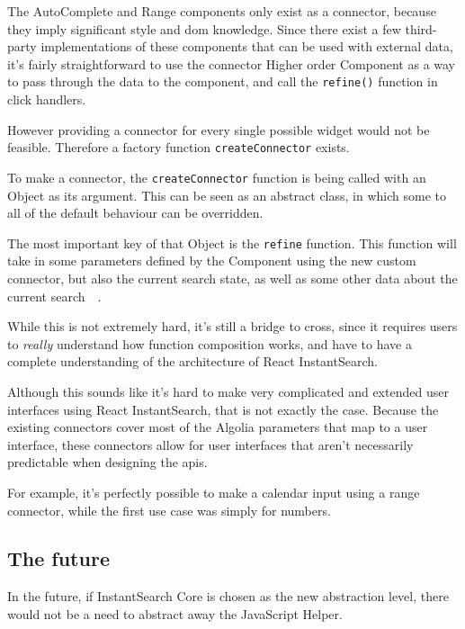 The AutoComplete and Range components only exist as a connector, because they imply significant style and \acrshort{dom} knowledge. Since there exist a few third-party implementations of these components that can be used with external data, it's fairly straightforward to use the connector Higher order Component as a way to pass through the data to the component, and call the {\tt refine()} function in click handlers. 

However providing a connector for every single possible widget would not be feasible. Therefore a factory function {\tt createConnector} exists.

To make a connector, the {\tt createConnector} function is being called with an Object as its argument. This can be seen as an abstract class, in which some to all of the default behaviour can be overridden. 

The most important key of that Object is the {\tt refine} function. This function will take in some parameters defined by the Component using the new custom connector, but also the current search state, as well as some other data about the current search~\cite{react-instantsearch-custom-connectors}~.

While this is not extremely hard, it's still a bridge to cross, since it requires users to \emph{really} understand how function composition works, and have to have a complete understanding of the architecture of React InstantSearch.

Although this sounds like it's hard to make very complicated and extended user interfaces using React InstantSearch, that is not exactly the case. Because the existing connectors cover most of the Algolia parameters that map to a user interface, these connectors allow for user interfaces that aren't necessarily predictable when designing the \acrshort{api}s. 

For example, it's perfectly possible to make a calendar input using a range connector, while the first use case was simply for numbers.


\subsection{The future} %
\label{sub:the_future}

In the future, if InstantSearch Core is chosen as the new abstraction level, there would not be a need to abstract away the JavaScript Helper. 

